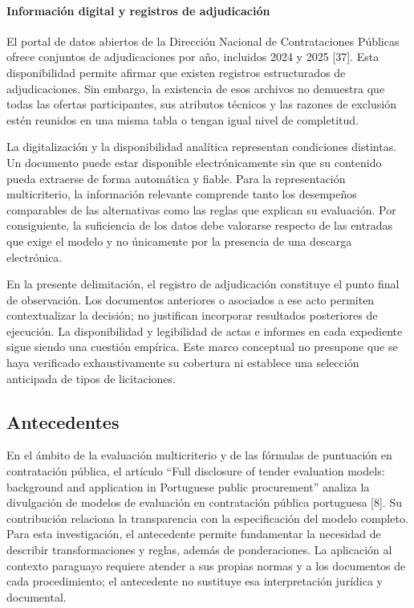 \documentclass[12pt,a4paper]{article}
\begin{document}
\paragraph{Información digital y registros de adjudicación}

El portal de datos abiertos de la Dirección Nacional de Contrataciones Públicas ofrece conjuntos de adjudicaciones por año, incluidos 2024 y 2025 [37]. Esta disponibilidad permite afirmar que existen registros estructurados de adjudicaciones. Sin embargo, la existencia de esos archivos no demuestra que todas las ofertas participantes, sus atributos técnicos y las razones de exclusión estén reunidos en una misma tabla o tengan igual nivel de completitud.

La digitalización y la disponibilidad analítica representan condiciones distintas. Un documento puede estar disponible electrónicamente sin que su contenido pueda extraerse de forma automática y fiable. Para la representación multicriterio, la información relevante comprende tanto los desempeños comparables de las alternativas como las reglas que explican su evaluación. Por consiguiente, la suficiencia de los datos debe valorarse respecto de las entradas que exige el modelo y no únicamente por la presencia de una descarga electrónica.

En la presente delimitación, el registro de adjudicación constituye el punto final de observación. Los documentos anteriores o asociados a ese acto permiten contextualizar la decisión; no justifican incorporar resultados posteriores de ejecución. La disponibilidad y legibilidad de actas e informes en cada expediente sigue siendo una cuestión empírica. Este marco conceptual no presupone que se haya verificado exhaustivamente su cobertura ni establece una selección anticipada de tipos de licitaciones.

\subsection{Antecedentes}




En el ámbito de la evaluación multicriterio y de las fórmulas de puntuación en contratación pública, el artículo ``Full disclosure of tender evaluation models: background and application in Portuguese public procurement'' analiza la divulgación de modelos de evaluación en contratación pública portuguesa [8]. Su contribución relaciona la transparencia con la especificación del modelo completo. Para esta investigación, el antecedente permite fundamentar la necesidad de describir transformaciones y reglas, además de ponderaciones. La aplicación al contexto paraguayo requiere atender a sus propias normas y a los documentos de cada procedimiento; el antecedente no sustituye esa interpretación jurídica y documental.
\end{document}
